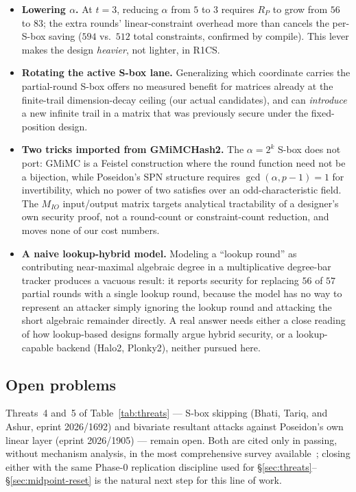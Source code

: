 \documentclass[11pt]{article}
\begin{document}
\begin{itemize}[leftmargin=1.4em]
  \item \textbf{Lowering $\alpha$.} At $t=3$, reducing $\alpha$ from $5$
  to $3$ requires $R_P$ to grow from $56$ to $83$; the extra rounds'
  linear-constraint overhead more than cancels the per-S-box saving
  ($594$ vs.\ $512$ total constraints, confirmed by compile). This lever
  makes the design \emph{heavier}, not lighter, in R1CS.
  \item \textbf{Rotating the active S-box lane.} Generalizing which
  coordinate carries the partial-round S-box offers no measured benefit
  for matrices already at the finite-trail dimension-decay ceiling (our
  actual candidates), and can \emph{introduce} a new infinite trail in a
  matrix that was previously secure under the fixed-position design.
  \item \textbf{Two tricks imported from GMiMCHash2.} The $\alpha=2^k$
  S-box does not port: GMiMC is a Feistel construction where the round
  function need not be a bijection, while Poseidon's SPN structure
  requires $\gcd(\alpha,p-1)=1$ for invertibility, which no power of two
  satisfies over an odd-characteristic field. The $M_{IO}$ input/output
  matrix targets analytical tractability of a designer's own security
  proof, not a round-count or constraint-count reduction, and moves none
  of our cost numbers.
  \item \textbf{A naive lookup-hybrid model.} Modeling a ``lookup round''
  as contributing near-maximal algebraic degree in a multiplicative
  degree-bar tracker produces a vacuous result: it reports security for
  replacing $56$ of $57$ partial rounds with a single lookup round,
  because the model has no way to represent an attacker simply ignoring
  the lookup round and attacking the short algebraic remainder directly.
  A real answer needs either a close reading of how lookup-based designs
  formally argue hybrid security, or a lookup-capable backend (Halo2,
  Plonky2), neither pursued here.
\end{itemize}

\subsection{Open problems}

Threats~4 and~5 of Table~\ref{tab:threats} --- S-box skipping (Bhati,
Tariq, and Ashur, eprint 2026/1692) and bivariate resultant attacks
against Poseidon's own linear layer (eprint 2026/1905) --- remain open.
Both are cited only in passing, without mechanism analysis, in the most
comprehensive survey available~\cite{sok2026}; closing either with the
same Phase-0 replication discipline used for
\S\ref{sec:threats}--\S\ref{sec:midpoint-reset} is the natural next step
for this line of work.
\end{document}
